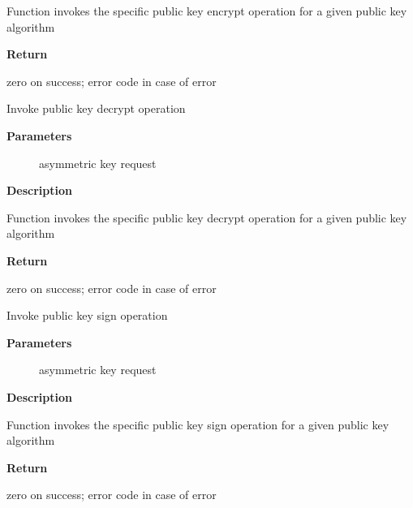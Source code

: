 \documentclass[a4paper,8pt,english]{sphinxmanual}
\begin{document}
Function invokes the specific public key encrypt operation for a given
public key algorithm

\textbf{Return}

zero on success; error code in case of error

\begin{fulllineitems}
\label{crypto/api-akcipher:c.crypto_akcipher_decrypt}
Invoke public key decrypt operation

\end{fulllineitems}


\textbf{Parameters}
\begin{description}
\item[{}] \leavevmode
asymmetric key request

\end{description}

\textbf{Description}

Function invokes the specific public key decrypt operation for a given
public key algorithm

\textbf{Return}

zero on success; error code in case of error

\begin{fulllineitems}
\label{crypto/api-akcipher:c.crypto_akcipher_sign}
Invoke public key sign operation

\end{fulllineitems}


\textbf{Parameters}
\begin{description}
\item[{}] \leavevmode
asymmetric key request

\end{description}

\textbf{Description}

Function invokes the specific public key sign operation for a given
public key algorithm

\textbf{Return}

zero on success; error code in case of error
\end{document}
